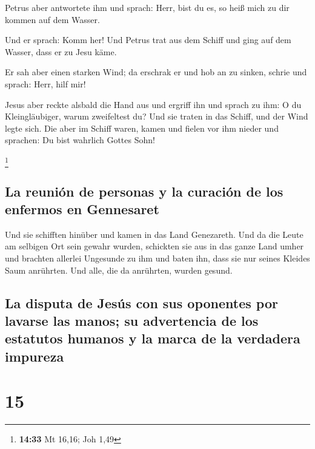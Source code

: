  Petrus aber antwortete ihm und sprach: Herr, bist du es,
so heiß mich zu dir kommen auf dem Wasser.

 Und er sprach: Komm her! Und Petrus trat aus dem Schiff
und ging auf dem Wasser, dass er zu Jesu käme.

 Er sah aber einen starken Wind; da erschrak er und hob
an zu sinken, schrie und sprach: Herr, hilf mir!

 Jesus aber reckte alsbald die Hand aus und ergriff ihn
und sprach zu ihm: O du Kleingläubiger, warum zweifeltest du?
 Und sie traten in das Schiff, und der Wind legte sich.
 Die aber im Schiff waren, kamen und fielen vor ihm
nieder und sprachen: Du bist wahrlich Gottes Sohn!

\footnote{\textbf{14:33} Mt 16,16; Joh 1,49}

\hypertarget{la-reuniuxf3n-de-personas-y-la-curaciuxf3n-de-los-enfermos-en-gennesaret}{%
\subsection{La reunión de personas y la curación de los enfermos en
Gennesaret}\label{la-reuniuxf3n-de-personas-y-la-curaciuxf3n-de-los-enfermos-en-gennesaret}}

 Und sie schifften hinüber und kamen in das Land
Genezareth.  Und da die Leute am selbigen Ort sein gewahr
wurden, schickten sie aus in das ganze Land umher und brachten allerlei
Ungesunde zu ihm  und baten ihn, dass sie nur seines
Kleides Saum anrührten. Und alle, die da anrührten, wurden gesund.

\hypertarget{la-disputa-de-jesuxfas-con-sus-oponentes-por-lavarse-las-manos-su-advertencia-de-los-estatutos-humanos-y-la-marca-de-la-verdadera-impureza}{%
\subsection{La disputa de Jesús con sus oponentes por lavarse las manos;
su advertencia de los estatutos humanos y la marca de la verdadera
impureza}\label{la-disputa-de-jesuxfas-con-sus-oponentes-por-lavarse-las-manos-su-advertencia-de-los-estatutos-humanos-y-la-marca-de-la-verdadera-impureza}}

\hypertarget{section-14}{%
\section{15}\label{section-14}}

